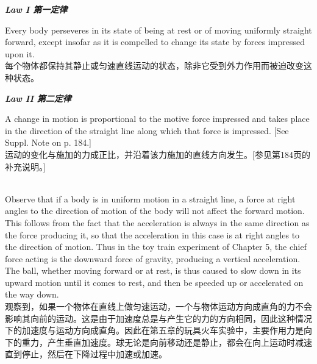 \documentclass{article}
\begin{document}
\addtolength{\leftskip}{1cm}
\addtolength{\rightskip}{1cm}

\begin{center}
\noindent\textbf\textit{Law I 第一定律}
\end{center}
\noindent Every body perseveres in its state of being at rest or of moving uniformly straight forward, except insofar as it is compelled to change its state by forces impressed upon it.\\
每个物体都保持其静止或匀速直线运动的状态，除非它受到外力作用而被迫改变这种状态。\\

\begin{center}
\noindent\textbf\textit{Law II 第二定律}
\end{center}
\noindent A change in motion is proportional to the motive force impressed and takes place in the direction of the straight line along which that force is impressed. [See Suppl. Note on p. 184.]\\
运动的变化与施加的力成正比，并沿着该力施加的直线方向发生。[参见第184页的补充说明。]\\

\addtolength{\leftskip}{-1cm}
\addtolength{\rightskip}{-1cm}

\\
Observe that if a body is in uniform motion in a straight line, a force at right angles to the direction of motion of the body will not affect the forward motion. This follows from the fact that the acceleration is always in the same direction as the force producing it, so that the acceleration in this case is at right angles to the direction of motion. Thus in the toy train experiment of Chapter 5, the chief force acting is the downward force of gravity, producing a vertical acceleration. The ball, whether moving forward or at rest, is thus caused to slow down in its upward motion until it comes to rest, and then be speeded up or accelerated on the way down.\\
观察到，如果一个物体在直线上做匀速运动，一个与物体运动方向成直角的力不会影响其向前的运动。这是由于加速度总是与产生它的力的方向相同，因此这种情况下的加速度与运动方向成直角。因此在第五章的玩具火车实验中，主要作用力是向下的重力，产生垂直加速度。球无论是向前移动还是静止，都会在向上运动时减速直到停止，然后在下降过程中加速或加速。\\
\end{document}
